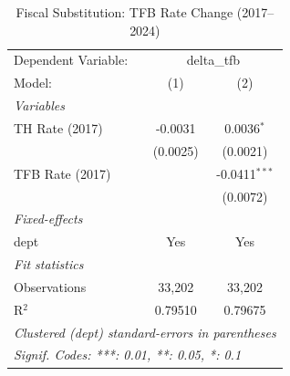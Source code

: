 \begin{table}[htbp]
   \caption{\label{tab:fiscal_sub} Fiscal Substitution: TFB Rate Change (2017--2024)}
   \centering
   \begin{tabular}{lcc}
      \tabularnewline \midrule \midrule
      Dependent Variable: & \multicolumn{2}{c}{delta\_tfb}\\
      Model:          & (1)      & (2)\\  
      \midrule
      \emph{Variables}\\
      TH Rate (2017)  & -0.0031  & 0.0036$^{*}$\\   
                      & (0.0025) & (0.0021)\\   
      TFB Rate (2017) &          & -0.0411$^{***}$\\   
                      &          & (0.0072)\\   
      \midrule
      \emph{Fixed-effects}\\
      dept            & Yes      & Yes\\  
      \midrule
      \emph{Fit statistics}\\
      Observations    & 33,202   & 33,202\\  
      R$^2$           & 0.79510  & 0.79675\\  
      \midrule \midrule
      \multicolumn{3}{l}{\emph{Clustered (dept) standard-errors in parentheses}}\\
      \multicolumn{3}{l}{\emph{Signif. Codes: ***: 0.01, **: 0.05, *: 0.1}}\\
   \end{tabular}
\end{table}
